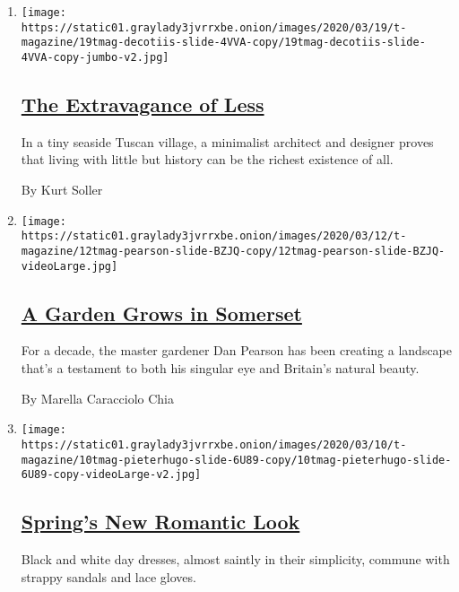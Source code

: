 \begin{enumerate}
\def\labelenumi{\arabic{enumi}.}
\item
  \texttt{[image: https://static01.graylady3jvrrxbe.onion/images/2020/03/19/t-magazine/19tmag-decotiis-slide-4VVA-copy/19tmag-decotiis-slide-4VVA-copy-jumbo-v2.jpg]}

  \hypertarget{the-extravagance-of-less}{%
  \subsection{\texorpdfstring{\href{/2020/03/19/t-magazine/vincenzo-de-cotiis-home-tuscany.html}{The
  Extravagance of
  Less}}{The Extravagance of Less}}\label{the-extravagance-of-less}}

  In a tiny seaside Tuscan village, a minimalist architect and designer
  proves that living with little but history can be the richest
  existence of all.

  By Kurt Soller
\item
  \texttt{[image: https://static01.graylady3jvrrxbe.onion/images/2020/03/12/t-magazine/12tmag-pearson-slide-BZJQ-copy/12tmag-pearson-slide-BZJQ-videoLarge.jpg]}

  \hypertarget{a-garden-grows-in-somerset}{%
  \subsection{\texorpdfstring{\href{/2020/03/12/t-magazine/master-gardener-dan-pearson.html}{A
  Garden Grows in
  Somerset}}{A Garden Grows in Somerset}}\label{a-garden-grows-in-somerset}}

  For a decade, the master gardener Dan Pearson has been creating a
  landscape that's a testament to both his singular eye and Britain's
  natural beauty.

  By Marella Caracciolo Chia
\item
  \texttt{[image: https://static01.graylady3jvrrxbe.onion/images/2020/03/10/t-magazine/10tmag-pieterhugo-slide-6U89-copy/10tmag-pieterhugo-slide-6U89-copy-videoLarge-v2.jpg]}

  \hypertarget{springs-new-romantic-look}{%
  \subsection{\texorpdfstring{\href{/2020/03/10/t-magazine/spring-fashion-romantic-look.html}{Spring's
  New Romantic
  Look}}{Spring's New Romantic Look}}\label{springs-new-romantic-look}}

  Black and white day dresses, almost saintly in their simplicity,
  commune with strappy sandals and lace gloves.


\end{enumerate}
